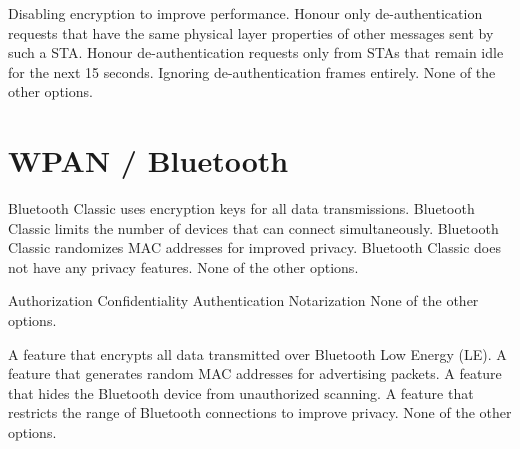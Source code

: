 \begin{questions}
    \begin{checkboxes}
        \choice Disabling encryption to improve performance.
        \CorrectChoice Honour only de-authentication requests that have the same physical layer properties of other messages sent by such a STA.
        \CorrectChoice Honour de-authentication requests only from STAs that remain idle for the next 15 seconds.
        \CorrectChoice Ignoring de-authentication frames entirely.
        \choice None of the other options.
    \end{checkboxes}


    \section{WPAN / Bluetooth}

    \begin{checkboxes}
        \choice Bluetooth Classic uses encryption keys for all data transmissions.
        \choice Bluetooth Classic limits the number of devices that can connect simultaneously.
        \choice Bluetooth Classic randomizes MAC addresses for improved privacy.
        \choice Bluetooth Classic does not have any privacy features.
        \choice None of the other options.
    \end{checkboxes}


    \begin{checkboxes}
        \CorrectChoice Authorization
        \CorrectChoice Confidentiality
        \CorrectChoice Authentication
        \choice Notarization
        \choice None of the other options.
    \end{checkboxes}




    \begin{checkboxes}
        \choice A feature that encrypts all data transmitted over Bluetooth Low Energy (LE).
        \CorrectChoice A feature that generates random MAC addresses for advertising packets.
        \choice A feature that hides the Bluetooth device from unauthorized scanning.
        \choice A feature that restricts the range of Bluetooth connections to improve privacy.
        \choice None of the other options.
    \end{checkboxes}



\end{questions}
